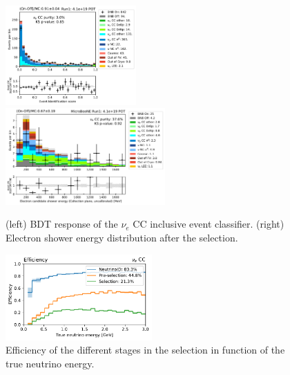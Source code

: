 

\begin{figure}
    \centering
    \includegraphics[width=0.445\textwidth]{NueCCsel/Images/run1/pre_event_score.pdf}
    \includegraphics[width=0.545\textwidth]{NueCCsel/Images/run1/nue_shower_energy_y.pdf}
    \caption{(left) BDT response of the $\nu_e$ CC inclusive event classifier. (right) Electron shower energy distribution after the selection.}
    \label{fig:pre_event_score}
\end{figure}


\begin{figure}
    \centering
    \includegraphics[width=0.5\textwidth]{NueCCsel/Images/run1/efficiency_all.pdf}
    \caption{Efficiency of the different stages in the selection in function of the true neutrino energy.}
    \label{fig:nueccinc_eff}
\end{figure}



